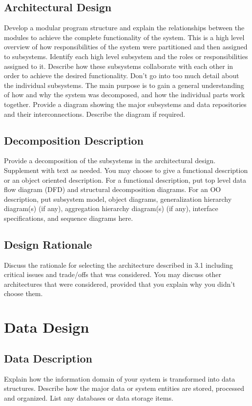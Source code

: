\documentclass[journal,10pt,onecolumn,compsoc]{IEEEtran}
\begin{document}
    \subsection{Architectural Design}
    Develop a modular program structure and explain the relationships between the
    modules to achieve the complete functionality of the system. This is a high level
    overview of how responsibilities of the system were partitioned and then assigned to
    subsystems. Identify each high level subsystem and the roles or responsibilities
    assigned to it. Describe how these subsystems collaborate with each other in order to
    achieve the desired functionality. Don’t go into too much detail about the individual
    subsystems. The main purpose is to gain a general understanding of how and why
    the system was decomposed, and how the individual parts work together. Provide a
    diagram showing the major subsystems and data repositories and their
    interconnections. Describe the diagram if required. 
    \subsection{Decomposition Description}
    Provide a decomposition of the subsystems in the architectural design. Supplement
    with text as needed. You may choose to give a functional description or an object
    oriented description.
    For a functional description, put top level data flow diagram (DFD) and structural
    decomposition diagrams.
    For an OO description, put subsystem model, object diagrams, generalization
    hierarchy diagram(s) (if any), aggregation hierarchy diagram(s) (if any), interface
    specifications, and sequence diagrams here.
    \subsection{Design Rationale}
    Discuss the rationale for selecting the architecture described in 3.1 including critical
    issues and trade/offs that was considered. You may discuss other architectures that
    were considered, provided that you explain why you didn’t choose them. 
    \section{Data Design}
    \subsection{Data Description}
    Explain how the information domain of your system is transformed into data
    structures. Describe how the major data or system entities are stored, processed and
    organized. List any databases or data storage items.
\end{document}
